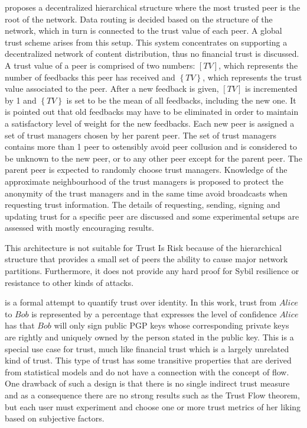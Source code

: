   \cite{vpc} proposes a decentralized hierarchical structure where the most trusted peer is the root of the network. Data
  routing is decided based on the structure of the network, which in turn is connected to the trust value of each peer. A
  global trust scheme arises from this setup. This system concentrates on supporting a decentralized network of content
  distribution, thus no financial trust is discussed. A trust value of a peer is comprised of two numbers: $\left[TV\right]$,
  which represents the number of feedbacks this peer has received and $\left\{TV\right\}$, which represents the trust value
  associated to the peer. After a new feedback is given, $\left[TV\right]$ is incremented by 1 and $\left\{TV\right\}$ is
  set to be the mean of all feedbacks, including the new one. It is pointed out that old feedbacks may have to be eliminated
  in order to maintain a satisfactory level of weight for the new feedbacks. Each new peer is assigned a set of trust
  managers chosen by her parent peer. The set of trust managers contains more than 1 peer to ostensibly avoid peer collusion
  and is considered to be unknown to the new peer, or to any other peer except for the parent peer. The parent peer is
  expected to randomly choose trust managers. Knowledge of the approximate neighbourhood of the trust managers is proposed to
  protect the anonymity of the trust managers and in the same time avoid broadcasts when requesting trust information. The
  details of requesting, sending, signing and updating trust for a specific peer are discussed and some experimental setups
  are assessed with mostly encouraging results.

  This architecture is not suitable for Trust Is Risk because of the hierarchical structure that provides a small set of
  peers the ability to cause major network partitions. Furthermore, it does not provide any hard proof for Sybil resilience
  or resistance to other kinds of attacks.

  \cite{wot} is a formal attempt to quantify trust over identity. In this work, trust from $Alice$ to $Bob$ is represented by
  a percentage that expresses the level of confidence $Alice$ has that $Bob$ will only sign public PGP keys whose
  corresponding private keys are rightly and uniquely owned by the person stated in the public key. This is a special use
  case for trust, much like financial trust which is a largely unrelated kind of trust. This type of trust has some
  transitive properties that are derived from statistical models and do not have a connection with the concept of flow. One
  drawback of such a design is that there is no single indirect trust measure and as a consequence there are no strong
  results such as the Trust Flow theorem, but each user must experiment and choose one or more trust metrics of her liking
  based on subjective factors.

